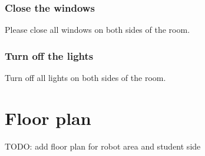 \subsubsection{Close the windows}
Please close all windows on both sides of the room.

\subsubsection{Turn off the lights}
Turn off all lights on both sides of the room.

\section{Floor plan}\label{sec:floorplan}
TODO: add floor plan for robot area and student side